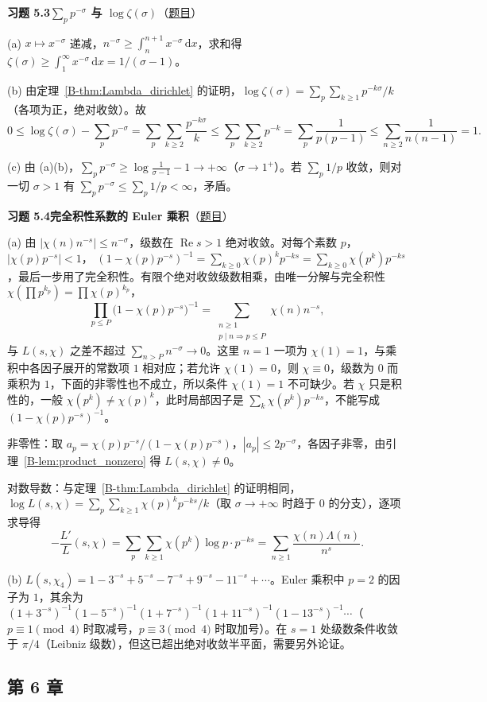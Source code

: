 \documentclass[11pt,a4paper]{article}
\newcommand{\dd}{\,\mathrm{d}}
\renewcommand{\Re}{\operatorname{Re}}
\newcommand{\bref}[1]{\ref*{B-#1}}
\newcommand{\Sol}[2]{%
  \par\addvspace{1.2em}\noindent
  \hypertarget{s:#1}{}\textbf{习题 #1\quad #2}\hfill{\small（\hyperlink{q:#1}{题目}）}\par
  \nopagebreak\smallskip}
\begin{document}
\Sol{5.3}{$\sum_pp^{-\sigma}$ 与 $\log\zeta(\sigma)$}
(a) $x\mapsto x^{-\sigma}$ 递减，$n^{-\sigma}\ge\int_n^{n+1}x^{-\sigma}\dd x$，求和得 $\zeta(\sigma)\ge\int_1^\infty x^{-\sigma}\dd x=1/(\sigma-1)$。

(b) 由定理~\bref{thm:Lambda_dirichlet} 的证明，$\log\zeta(\sigma)=\sum_p\sum_{k\ge1}p^{-k\sigma}/k$（各项为正，绝对收敛）。故
\[
  0\le\log\zeta(\sigma)-\sum_pp^{-\sigma}=\sum_p\sum_{k\ge2}\frac{p^{-k\sigma}}k\le\sum_p\sum_{k\ge2}p^{-k}=\sum_p\frac1{p(p-1)}\le\sum_{n\ge2}\frac1{n(n-1)}=1 .
\]

(c) 由 (a)(b)，$\sum_pp^{-\sigma}\ge\log\frac1{\sigma-1}-1\to+\infty$（$\sigma\to1^+$）。若 $\sum_p1/p$ 收敛，则对一切 $\sigma>1$ 有 $\sum_pp^{-\sigma}\le\sum_p1/p<\infty$，矛盾。

\Sol{5.4}{完全积性系数的 Euler 乘积}
(a) 由 $|\chi(n)n^{-s}|\le n^{-\sigma}$，级数在 $\Re s>1$ 绝对收敛。对每个素数 $p$，$|\chi(p)p^{-s}|<1$，
$(1-\chi(p)p^{-s})^{-1}=\sum_{k\ge0}\chi(p)^kp^{-ks}=\sum_{k\ge0}\chi(p^k)p^{-ks}$，最后一步用了完全积性。有限个绝对收敛级数相乘，由唯一分解与完全积性 $\chi(\prod p^{k_p})=\prod\chi(p)^{k_p}$，
\[
  \prod_{p\le P}\bigl(1-\chi(p)p^{-s}\bigr)^{-1}=\sum_{\substack{n\ge1\\ p\mid n\Rightarrow p\le P}}\chi(n)n^{-s},
\]
与 $L(s,\chi)$ 之差不超过 $\sum_{n>P}n^{-\sigma}\to0$。这里 $n=1$ 一项为 $\chi(1)=1$，与乘积中各因子展开的常数项 $1$ 相对应；若允许 $\chi(1)=0$，则 $\chi\equiv0$，级数为 $0$ 而乘积为 $1$，下面的非零性也不成立，所以条件 $\chi(1)=1$ 不可缺少。若 $\chi$ 只是积性的，一般 $\chi(p^k)\ne\chi(p)^k$，此时局部因子是 $\sum_k\chi(p^k)p^{-ks}$，不能写成 $(1-\chi(p)p^{-s})^{-1}$。

非零性：取 $a_p=\chi(p)p^{-s}/(1-\chi(p)p^{-s})$，$|a_p|\le2p^{-\sigma}$，各因子非零，由引理~\bref{lem:product_nonzero} 得 $L(s,\chi)\ne0$。

对数导数：与定理~\bref{thm:Lambda_dirichlet} 的证明相同，$\log L(s,\chi)=\sum_p\sum_{k\ge1}\chi(p)^kp^{-ks}/k$（取 $\sigma\to+\infty$ 时趋于 $0$ 的分支），逐项求导得
\[
  -\frac{L'}{L}(s,\chi)=\sum_p\sum_{k\ge1}\chi(p^k)\log p\cdot p^{-ks}=\sum_{n\ge1}\frac{\chi(n)\Lambda(n)}{n^s}.
\]

(b) $L(s,\chi_4)=1-3^{-s}+5^{-s}-7^{-s}+9^{-s}-11^{-s}+\cdots$。Euler 乘积中 $p=2$ 的因子为 $1$，其余为 $(1+3^{-s})^{-1}(1-5^{-s})^{-1}(1+7^{-s})^{-1}(1+11^{-s})^{-1}(1-13^{-s})^{-1}\cdots$（$p\equiv1\pmod4$ 时取减号，$p\equiv3\pmod4$ 时取加号）。在 $s=1$ 处级数条件收敛于 $\pi/4$（Leibniz 级数），但这已超出绝对收敛半平面，需要另外论证。

\subsection*{第 6 章}
\end{document}
